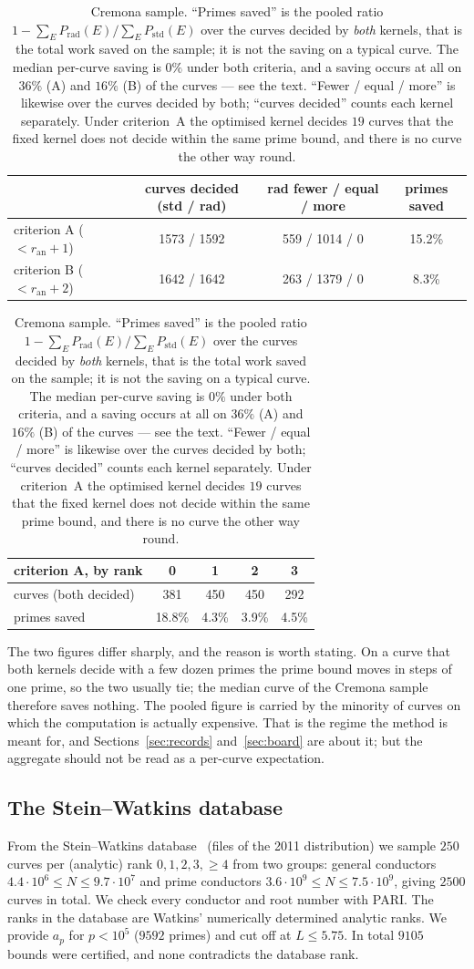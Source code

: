\documentclass[11pt]{amsart}
\theoremstyle{remark}
\theoremstyle{definition}
\newcommand{\ran}{r_{\mathrm{an}}}
\begin{document}
\begin{table}[h]
\centering\small
\begin{tabular}{lccc}
\toprule
 & curves decided (std / rad) & rad fewer / equal / more & primes saved\\
\midrule
criterion A ($<\ran+1$) & 1573 / 1592 & 559 / 1014 / 0 & 15.2\%\\
criterion B ($<\ran+2$) & 1642 / 1642 & 263 / 1379 / 0 & \phantom{1}8.3\%\\
\bottomrule
\end{tabular}

\smallskip
\begin{tabular}{lcccc}
\toprule
criterion A, by rank & 0 & 1 & 2 & 3\\
\midrule
curves (both decided) & 381 & 450 & 450 & 292\\
primes saved & 18.8\% & 4.3\% & 3.9\% & 4.5\%\\
\bottomrule
\end{tabular}
\caption{Cremona sample. ``Primes saved'' is the pooled ratio
$1-\sum_E P_{\mathrm{rad}}(E)/\sum_E P_{\mathrm{std}}(E)$ over the curves decided by \emph{both}
kernels, that is the total work saved on the sample; it is not the saving on a typical curve. The
median per-curve saving is $0\%$ under both criteria, and a saving occurs at all on $36\%$ (A) and
$16\%$ (B) of the curves --- see the text. ``Fewer / equal / more'' is likewise over the curves
decided by both; ``curves decided'' counts each kernel separately. Under criterion~A the optimised
kernel decides $19$ curves that the fixed kernel does not decide within the same prime bound, and
there is no curve the other way round.}
\label{tab:cremona}
\end{table}

The two figures differ sharply, and the reason is worth stating. On a curve that both kernels
decide with a few dozen primes the prime bound moves in steps of one prime, so the two usually tie;
the median curve of the Cremona sample therefore saves nothing. The pooled figure is carried by the
minority of curves on which the computation is actually expensive. That is the regime the method is
meant for, and Sections~\ref{sec:records} and~\ref{sec:board} are about it; but the aggregate should
not be read as a per-curve expectation.

\subsection{The Stein--Watkins database}
From the Stein--Watkins database~\cite{SW} (files of the 2011 distribution) we sample $250$ curves per (analytic) rank $0,1,2,3,\ge4$ from two groups: general conductors $4.4\cdot10^6\le N\le9.7\cdot10^7$ and prime conductors $3.6\cdot10^9\le N\le7.5\cdot10^9$, giving $2500$ curves in total. We check every conductor and root number with PARI. The ranks in the database are Watkins' numerically determined analytic ranks. We provide $a_p$ for $p<10^5$ ($9592$ primes) and cut off at $L\le5.75$. In total $9105$ bounds were certified, and none contradicts the database rank.
\end{document}
